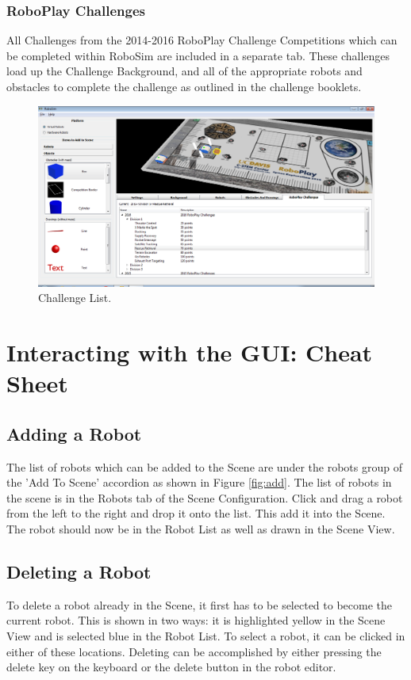 \documentclass{article}
\begin{document}
\subsubsection{RoboPlay Challenges}
All Challenges from the 2014-2016 RoboPlay Challenge Competitions which can be
completed within RoboSim are included in a separate tab.  These challenges load
up the Challenge Background, and all of the appropriate robots and obstacles to
complete the challenge as outlined in the challenge booklets.
\begin{figure}[H]
	\begin{center}
		\includegraphics[width=6in]{pictures/gui_challenges}
	\end{center}
	\caption{Challenge List.}
	\label{fig:challenges}
\end{figure}

%
%
\section{Interacting with the GUI: Cheat Sheet}
\subsection{Adding a Robot}
The list of robots which can be added to the Scene are under the robots group
of the 'Add To Scene' accordion as shown in Figure \ref{fig:add}.  The list of
robots in the scene is in the Robots tab of the Scene Configuration.  Click and
drag a robot from the left to the right and drop it onto the list.  This add it
into the Scene.  The robot should now be in the Robot List as well as drawn in
the Scene View.

\subsection{Deleting a Robot}
To delete a robot already in the Scene, it first has to be selected to become
the current robot.  This is shown in two ways: it is highlighted yellow in the
Scene View and is selected blue in the Robot List.  To select a robot, it can
be clicked in either of these locations.  Deleting can be accomplished by
either pressing the delete key on the keyboard or the delete button in the
robot editor.
\end{document}

